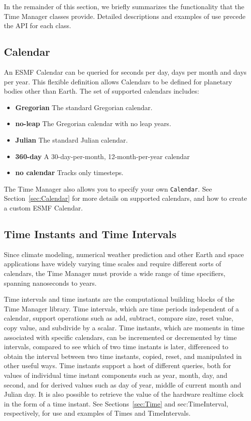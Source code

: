 In the remainder of this section, we briefly summarizes the 
functionality that the Time Manager classes provide.  Detailed 
descriptions and examples of use precede the API for each class.

\subsection{Calendar}
An ESMF Calendar can be queried for seconds per day, days per month 
and days per year.  This flexible definition allows Calendars to be 
defined for planetary bodies other than Earth.  The set of supported 
calendars includes:
\begin{itemize}
\item {\bf Gregorian} The standard Gregorian calendar.
\item {\bf no-leap} The Gregorian calendar with no leap years.
\item {\bf Julian} The standard Julian calendar.
\item {\bf 360-day} A 30-day-per-month, 12-month-per-year calendar
\item {\bf no calendar} Tracks only timesteps.
\end{itemize}
The Time Manager also allows you to specify your own {\tt Calendar}.
See Section~\ref{sec:Calendar} for more details on supported calendars, 
and how to create a custom ESMF Calendar.

\subsection{Time Instants and Time Intervals}
Since climate modeling, numerical weather prediction and other 
Earth and space applications have widely varying time scales and require 
different sorts of calendars, the Time Manager must provide a wide range 
of time specifiers, spanning nanoseconds to years.  

Time intervals and time instants are the computational building blocks of the
Time Manager library.  Time intervals, which are time periods independent 
of a calendar, support operations such as add, subtract, compare size, 
reset value, copy value, and subdivide by a scalar.  Time instants, which 
are moments in time associated with specific calendars, can be incremented 
or decremented by time intervals, compared to see which of two time instants 
is later, differenced to obtain the interval between two time instants, 
copied, reset, and manipulated in other useful ways.  Time instants support 
a host of different queries, both for values of individual time instant 
components such as year, month, day, and second, and for derived values such 
as day of year, middle of current month and Julian day.  It is also possible 
to retrieve the value of the hardware realtime clock in the form of a time 
instant.  See Sections~\ref{sec:Time} and {sec:TimeInterval}, respectively,
for use and examples of Times and TimeIntervals.

